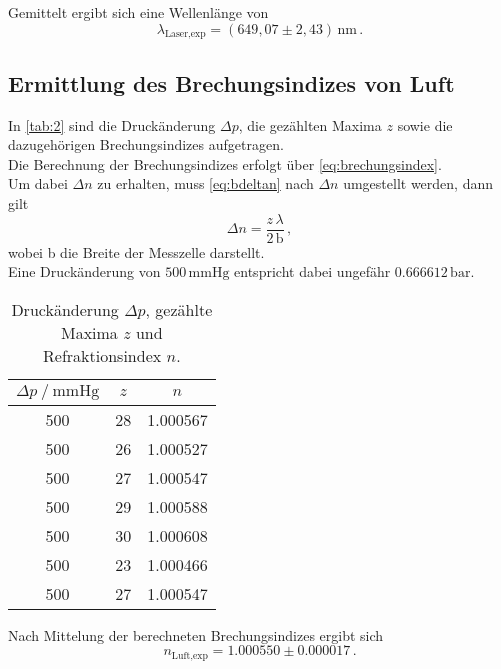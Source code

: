 Gemittelt ergibt sich eine Wellenlänge von
\begin{equation*}
    \lambda_\text{Laser,exp} = (649,07 \pm 2,43) \,\si{\nano\meter} \,.
\end{equation*}


\subsection{Ermittlung des Brechungsindizes von Luft}

In \autoref{tab:2} sind die Druckänderung $\Delta p$, die gezählten Maxima $z$ sowie die dazugehörigen Brechungsindizes aufgetragen. \\
Die Berechnung der Brechungsindizes erfolgt über \eqref{eq:brechungsindex}. \\
Um dabei $\Delta n $ zu erhalten, muss \eqref{eq:bdeltan} nach $\Delta n$ umgestellt werden, dann gilt
\begin{equation*}
    \Delta n = \dfrac{z \, \lambda}{2 \, \text{b}} \,,
\end{equation*} 
wobei b die Breite der Messzelle darstellt. \\
Eine Druckänderung von $500 \, \si{\milli\meter} \text{Hg}$ entspricht dabei ungefähr $0.666612 \,\si{\bar}$.

\begin{table}[H]
    \centering
    \caption{Druckänderung $\Delta p$, gezählte Maxima $z$ und Refraktionsindex $n$.}
    \label{tab:2}
    \begin{tabular}{S[table-format=3.0] S[table-format=2.0] S[table-format=1.6]}
      \toprule
    {$\Delta p \mathbin{/} \si{\milli\meter} \text{Hg}$} & {$z$} & {$n$} \\
                &           28          &           1.000567       \\
        500          &           26          &           1.000527       \\
        500          &           27          &           1.000547       \\
        500          &           29          &           1.000588       \\
        500          &           30          &           1.000608       \\
        500          &           23          &           1.000466       \\
        500          &           27          &           1.000547       \\
    \bottomrule
    \end{tabular}
\end{table}

Nach Mittelung der berechneten Brechungsindizes ergibt sich
\begin{equation*}
    n_\text{Luft,exp} = 1.000550 \pm 0.000017 \,.
\end{equation*}


